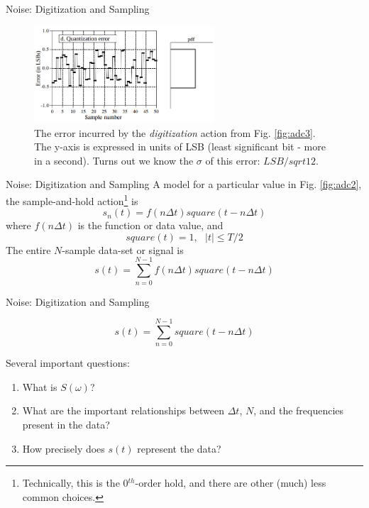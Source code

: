 \documentclass{beamer}
\begin{document}
\begin{frame}[fragile]{Noise: Digitization and Sampling}
\begin{figure}
\centering
\includegraphics[width=0.6\textwidth]{figures/adc_dac4.png}
\caption{\label{fig:adc4} The error incurred by the \textit{digitization} action from Fig. \ref{fig:adc3}.  The y-axis is expressed in units of LSB (least significant bit - more in a second). Turns out we know the $\sigma$ of this error: $LSB/sqrt{12}$.}
\end{figure}
\end{frame}

\begin{frame}[fragile]{Noise: Digitization and Sampling}
A model for a particular value in Fig. \ref{fig:adc2}, the sample-and-hold action\footnote{Technically, this is the 0$^{th}$-order hold, and there are other (much) less common choices.} is
\begin{equation}
s_n(t) = f(n\Delta t) square(t-n\Delta t)
\end{equation}
where $f(n\Delta t)$ is the function or data value, and 
\begin{equation}
square(t) = 1, ~~~ |t| \leq T/2
\end{equation}
The entire $N$-sample data-set or signal is
\begin{equation}
s(t) = \sum_{n=0}^{N-1} f(n\Delta t) square(t-n\Delta t)
\end{equation}
\end{frame}

\begin{frame}[fragile]{Noise: Digitization and Sampling}
\begin{tcolorbox}[colback=white,colframe=red!40!blue,title=Sample/Hold Signal Model]
\alert{
\begin{equation}
s(t) = \sum_{n=0}^{N-1} square(t-n\Delta t)
\end{equation}
}
\end{tcolorbox}
Several important questions:
\begin{enumerate}
\item What is $S(\omega)$?
\item What are the important relationships between $\Delta t$, $N$, and the frequencies present in the data?
\item How precisely does $s(t)$ represent the data?
\end{enumerate}
\end{frame}
\end{document}
